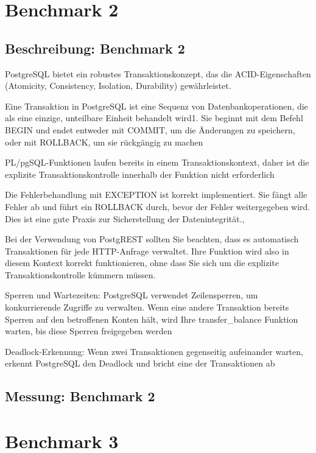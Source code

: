 \documentclass[fontsize=12pt,paper=a4,twoside=semi,parskip=half-,headsepline,headinclude]{scrreprt}
\begin{document}
\section{Benchmark 2}

\subsection{Beschreibung: Benchmark 2}

PostgreSQL bietet ein robustes Transaktionskonzept, das die ACID-Eigenschaften (Atomicity, Consistency, Isolation, Durability) gewährleistet.

Eine Transaktion in PostgreSQL ist eine Sequenz von Datenbankoperationen, die als eine einzige, unteilbare Einheit behandelt wird1. Sie beginnt mit dem Befehl BEGIN und endet entweder mit COMMIT, um die Änderungen zu speichern, oder mit ROLLBACK, um sie rückgängig zu machen

PL/pgSQL-Funktionen laufen bereits in einem Transaktionskontext, daher ist die explizite Transaktionskontrolle innerhalb der Funktion nicht erforderlich

Die Fehlerbehandlung mit EXCEPTION ist korrekt implementiert. Sie fängt alle Fehler ab und führt ein ROLLBACK durch, bevor der Fehler weitergegeben wird. Dies ist eine gute Praxis zur Sicherstellung der Datenintegrität.,

Bei der Verwendung von PostgREST sollten Sie beachten, dass es automatisch Transaktionen für jede HTTP-Anfrage verwaltet. Ihre Funktion wird also in diesem Kontext korrekt funktionieren, ohne dass Sie sich um die explizite Transaktionskontrolle kümmern müssen.

Sperren und Wartezeiten:
PostgreSQL verwendet Zeilensperren, um konkurrierende Zugriffe zu verwalten. Wenn eine andere Transaktion bereits Sperren auf den betroffenen Konten hält, wird Ihre transfer\_balance Funktion warten, bis diese Sperren freigegeben werden

Deadlock-Erkennung:
Wenn zwei Transaktionen gegenseitig aufeinander warten, erkennt PostgreSQL den Deadlock und bricht eine der Transaktionen ab

\subsection{Messung: Benchmark 2}

\section{Benchmark 3}
\end{document}
